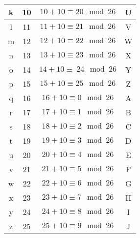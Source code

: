 \documentclass[10pt,a4paper]{article}
\begin{document}
\begin{table}[htdp]
\begin{center}
\begin{tabular}{|c|c|c|c|}
	k & 10 & \begin{math} 10 + 10 \equiv 20 \mod 26 \end{math}  & U \\ \hline
	l & 11 & \begin{math} 11+ 10 \equiv 21 \mod 26 \end{math}  & V \\ \hline
	m & 12 & \begin{math} 12 + 10 \equiv 22 \mod 26 \end{math} & W \\ \hline
	n & 13 & \begin{math} 13 + 10 \equiv 23 \mod 26 \end{math} & X \\ \hline
	o & 14 & \begin{math} 14 + 10 \equiv\ 24 \mod 26 \end{math} & Y \\ \hline
	p & 15 & \begin{math} 15 + 10 \equiv 25 \mod 26 \end{math} & Z \\ \hline
	q & 16 & \begin{math} 16 + 10 \equiv 0 \mod 26 \end{math} & A \\ \hline
	r & 17 & \begin{math} 17 + 10 \equiv 1 \mod 26 \end{math}  & B \\ \hline
	s & 18 & \begin{math} 18 + 10 \equiv 2 \mod 26 \end{math} & C \\ \hline
	t & 19 & \begin{math} 19 + 10 \equiv 3 \mod 26 \end{math} & D \\ \hline
	u & 20 & \begin{math} 20 + 10 \equiv 4 \mod 26 \end{math} & E \\ \hline
	v & 21 & \begin{math} 21 + 10 \equiv 5 \mod 26 \end{math} & F \\ \hline
	w & 22 & \begin{math} 22 + 10 \equiv 6 \mod 26 \end{math} & G \\ \hline
	x & 23 & \begin{math} 23 + 10 \equiv 7 \mod 26 \end{math}  & H \\ \hline
	y & 24 & \begin{math} 24 + 10 \equiv 8 \mod 26 \end{math} & I \\ \hline
	z & 25 & \begin{math} 25 + 10 \equiv 9 \mod 26 \end{math} & J \\ \hline
\end{tabular}
\end{center}
\label{default}
\end{table}%
\end{document}
